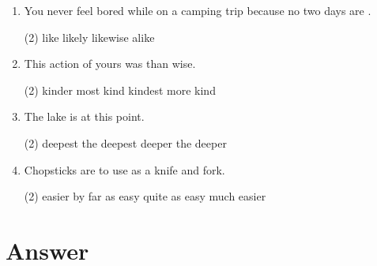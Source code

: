 \begin{enumerate}
\item You never feel bored while on a camping trip because no two days are \ttu.
  \begin{tasks}(2)
    \task like
    \task likely
    \task likewise
    \task alike
  \end{tasks}

\item This action of yours was \ttu than wise.
  \begin{tasks}(2)
    \task kinder
    \task most kind
    \task kindest
    \task more kind
  \end{tasks}

\item The lake is \ttu at this point.
  \begin{tasks}(2)
    \task deepest
    \task the deepest
    \task deeper
    \task the deeper
  \end{tasks}

\item Chopsticks are \ttu to use as a knife and fork.
  \begin{tasks}(2)
    \task easier
    \task by far as easy
    \task quite as easy
    \task much easier
  \end{tasks}

\end{enumerate}

\section{Answer}

